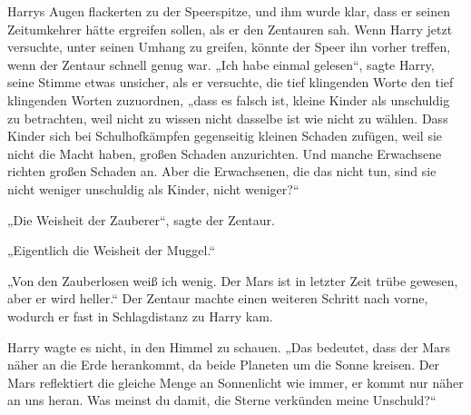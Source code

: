 Harrys Augen flackerten zu der Speerspitze, und ihm wurde klar, dass er seinen Zeitumkehrer hätte ergreifen sollen, als er den Zentauren sah. Wenn Harry jetzt versuchte, unter seinen Umhang zu greifen, könnte der Speer ihn vorher treffen, wenn der Zentaur schnell genug war.
„Ich habe einmal gelesen“, sagte Harry, seine Stimme etwas unsicher, als er versuchte, die tief klingenden Worte den tief klingenden Worten zuzuordnen,
„dass es falsch ist, kleine Kinder als unschuldig zu betrachten, weil nicht zu wissen nicht dasselbe ist wie nicht zu wählen. Dass Kinder sich bei Schulhofkämpfen gegenseitig kleinen Schaden zufügen, weil sie nicht die Macht haben, großen Schaden anzurichten. Und manche Erwachsene richten großen Schaden an. Aber die Erwachsenen, die das nicht tun, sind sie nicht weniger unschuldig als Kinder, nicht weniger?“

„Die Weisheit der Zauberer“, sagte der Zentaur.

„Eigentlich die Weisheit der Muggel.“

„Von den Zauberlosen weiß ich wenig. Der Mars ist in letzter Zeit trübe gewesen, aber er wird heller.“ Der Zentaur machte einen weiteren Schritt nach vorne, wodurch er fast in Schlagdistanz zu Harry kam.

Harry wagte es nicht, in den Himmel zu schauen.
„Das bedeutet, dass der Mars näher an die Erde herankommt, da beide Planeten um die Sonne kreisen. Der Mars reflektiert die gleiche Menge an Sonnenlicht wie immer, er kommt nur näher an uns heran. Was meinst du damit, die Sterne verkünden meine Unschuld?“

